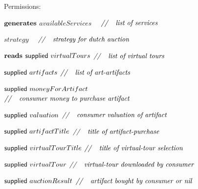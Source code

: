 \documentclass[paper=letter, fontsize=12pt]{article}
\begin{document}
\begin{figure}[H]
\begin{center}
{{\setlength\parindent{14pt} Permissions: 
\par\setlength\parindent{84pt}$\text{\textbf{generates}}$ \hspace{1em} $ availableServices \quad $ \hspace{3.6em} $\text{\textit{//}} \quad \text{\textit{list of services}}$
\par\setlength\parindent{143pt}$strategy \quad $ \hspace{7.6em} $\text{\textit{//}} \quad \text{\textit{strategy for dutch auction}}$
\par\setlength\parindent{84pt}$\text{\textbf{reads}}$ \hspace{2.9em} $ \text{{\fontfamily{\sfdefault}\selectfont supplied }}virtualTours$ \hspace{2.8em} $\text{\textit{//}} \quad \text{\textit{list of virtual tours}}$
\par\setlength\parindent{143pt}$\text{{\fontfamily{\sfdefault}\selectfont supplied }}artifacts $ \hspace{4.5em}$\text{\textit{//}} \quad \text{\textit{list of art-artifacts}}$
\par\setlength\parindent{143pt}$\text{{\fontfamily{\sfdefault}\selectfont supplied }}moneyForArtifact$\hspace{0.3em} $\text{\textit{//}} \quad \text{\textit{consumer money to purchase artifact}}$
\par\setlength\parindent{143pt}$\text{{\fontfamily{\sfdefault}\selectfont supplied }}valuation$\hspace{4.0em} $\text{\textit{//}} \quad \text{\textit{consumer valuation of artifact}}$
\par\setlength\parindent{143pt}$\text{{\fontfamily{\sfdefault}\selectfont supplied }}artifactTitle$\hspace{2.9em} $\text{\textit{//}} \quad \text{\textit{title of artifact-purchase}}$
\par\setlength\parindent{143pt}$\text{{\fontfamily{\sfdefault}\selectfont supplied }}virtualTourTitle$\hspace{1.1em} $\text{\textit{//}} \quad \text{\textit{title of virtual-tour selection}}$
\par\setlength\parindent{143pt}$\text{{\fontfamily{\sfdefault}\selectfont supplied }}virtualTour$\hspace{3.0em} $\text{\textit{//}} \quad \text{\textit{virtual-tour downloaded by consumer}}$
\par\setlength\parindent{143pt}$\text{{\fontfamily{\sfdefault}\selectfont supplied }}auctionResult$\hspace{1.8em} $\text{\textit{//}} \quad \text{\textit{artifact bought by consumer or nil}}$
\\

}}
\end{center}
\end{figure}
\end{document}
